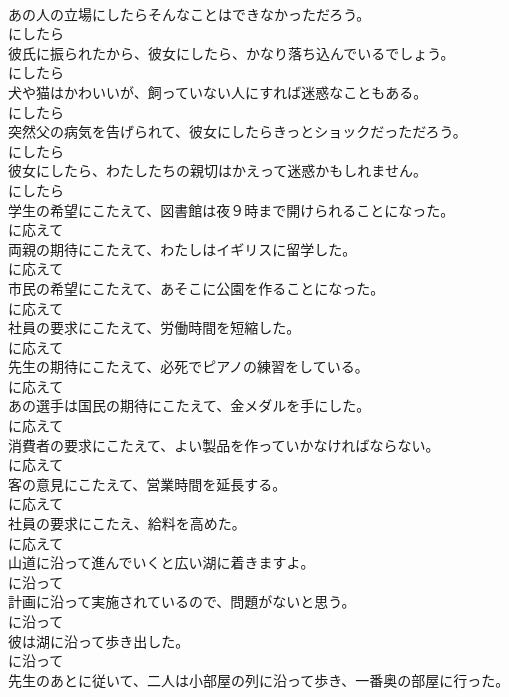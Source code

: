 \documentclass[8pt]{extreport}
\begin{document}
\begin{CJK}{UTF8}{min}
\\	あの人の立場にしたらそんなことはできなかっただろう。	
\\	にしたら	
\\	彼氏に振られたから、彼女にしたら、かなり落ち込んでいるでしょう。	
\\	にしたら	
\\	犬や猫はかわいいが、飼っていない人にすれば迷惑なこともある。	
\\	にしたら	
\\	突然父の病気を告げられて、彼女にしたらきっとショックだっただろう。	
\\	にしたら	
\\	彼女にしたら、わたしたちの親切はかえって迷惑かもしれません。	
\\	にしたら	
\\	学生の希望にこたえて、図書館は夜９時まで開けられることになった。	
\\	に応えて	
\\	両親の期待にこたえて、わたしはイギリスに留学した。	
\\	に応えて	
\\	市民の希望にこたえて、あそこに公園を作ることになった。	
\\	に応えて	
\\	社員の要求にこたえて、労働時間を短縮した。	
\\	に応えて	
\\	先生の期待にこたえて、必死でピアノの練習をしている。	
\\	に応えて	
\\	あの選手は国民の期待にこたえて、金メダルを手にした。	
\\	に応えて	
\\	消費者の要求にこたえて、よい製品を作っていかなければならない。	
\\	に応えて	
\\	客の意見にこたえて、営業時間を延長する。	
\\	に応えて	
\\	社員の要求にこたえ、給料を高めた。	
\\	に応えて	
\\	山道に沿って進んでいくと広い湖に着きますよ。	
\\	に沿って	
\\	計画に沿って実施されているので、問題がないと思う。	
\\	に沿って	
\\	彼は湖に沿って歩き出した。	
\\	に沿って	
\\	先生のあとに従いて、二人は小部屋の列に沿って歩き、一番奥の部屋に行った。	

\end{CJK}
\end{document}
